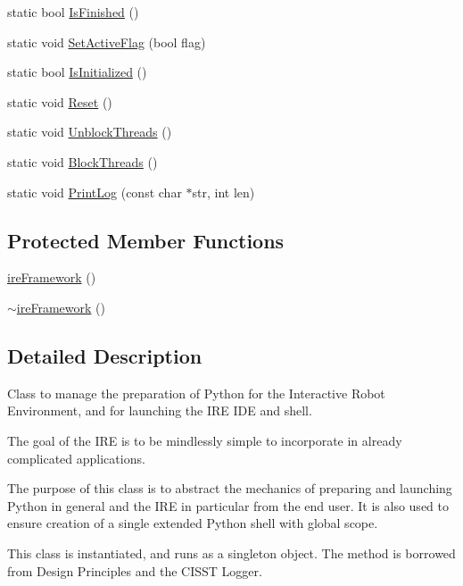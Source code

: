 \begin{DoxyCompactItemize}
\item 
static bool \hyperlink{classire_framework_aca836de894736d5e77cea1c6aaedfef5}{Is\+Finished} ()
\item 
static void \hyperlink{classire_framework_a309c6b989cf90fa50dd48f6ca0532cba}{Set\+Active\+Flag} (bool flag)
\item 
static bool \hyperlink{classire_framework_a7ab5891c373df535e295de09fa35d83f}{Is\+Initialized} ()
\item 
static void \hyperlink{classire_framework_a18ebff7b6ec518691c58963fcc0d2d28}{Reset} ()
\item 
static void \hyperlink{classire_framework_ac85895cffa08cc252259b9ab3e896b4d}{Unblock\+Threads} ()
\item 
static void \hyperlink{classire_framework_a3660a5a27d46361e369b2bdc1a596ec4}{Block\+Threads} ()
\item 
static void \hyperlink{classire_framework_a003bbae61193a9a61849b861039d0e89}{Print\+Log} (const char $\ast$str, int len)
\end{DoxyCompactItemize}
\subsection*{Protected Member Functions}
\begin{DoxyCompactItemize}
\item 
\hyperlink{classire_framework_abeb6527e0593ce83c0d8806debb4482d}{ire\+Framework} ()
\item 
\hyperlink{classire_framework_a11255dbb105b457dd65923fde9385e5c}{$\sim$ire\+Framework} ()
\end{DoxyCompactItemize}


\subsection{Detailed Description}
Class to manage the preparation of Python for the Interactive Robot Environment, and for launching the I\+R\+E I\+D\+E and shell. 

The goal of the I\+R\+E is to be mindlessly simple to incorporate in already complicated applications.

The purpose of this class is to abstract the mechanics of preparing and launching Python in general and the I\+R\+E in particular from the end user. It is also used to ensure creation of a single extended Python shell with global scope.

This class is instantiated, and runs as a singleton object. The method is borrowed from Design Principles and the C\+I\+S\+S\+T Logger.

